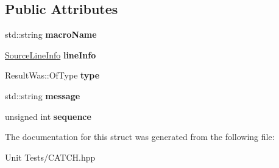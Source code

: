\subsection*{Public Attributes}
\begin{DoxyCompactItemize}
\item 
std\+::string {\bfseries macro\+Name}\hypertarget{structCatch_1_1MessageInfo_a156ade4b3cc731f6ec7b542ae47ba8e3}{}\label{structCatch_1_1MessageInfo_a156ade4b3cc731f6ec7b542ae47ba8e3}

\item 
\hyperlink{structCatch_1_1SourceLineInfo}{Source\+Line\+Info} {\bfseries line\+Info}\hypertarget{structCatch_1_1MessageInfo_a985165328723e599696ebd8e43195cc5}{}\label{structCatch_1_1MessageInfo_a985165328723e599696ebd8e43195cc5}

\item 
Result\+Was\+::\+Of\+Type {\bfseries type}\hypertarget{structCatch_1_1MessageInfo_ae928b9117465c696e45951d9d0284e78}{}\label{structCatch_1_1MessageInfo_ae928b9117465c696e45951d9d0284e78}

\item 
std\+::string {\bfseries message}\hypertarget{structCatch_1_1MessageInfo_ab6cd06e050bf426c6577502a5c50e256}{}\label{structCatch_1_1MessageInfo_ab6cd06e050bf426c6577502a5c50e256}

\item 
unsigned int {\bfseries sequence}\hypertarget{structCatch_1_1MessageInfo_a7f4f57ea21e50160adefce7b68a781d6}{}\label{structCatch_1_1MessageInfo_a7f4f57ea21e50160adefce7b68a781d6}

\end{DoxyCompactItemize}


The documentation for this struct was generated from the following file\+:\begin{DoxyCompactItemize}
\item 
Unit Tests/C\+A\+T\+C\+H.\+hpp\end{DoxyCompactItemize}
